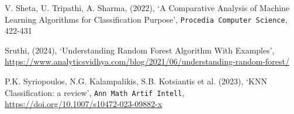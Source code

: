 \documentclass[11pt,a4paper]{article}
\begin{document}
\begin{thebibliography}{9}
V. Sheta, U. Tripathi, A. Sharma, (2022), `A Comparative Analysis of Machine Learning Algorithms for Classification Purpose', \texttt{Procedia Computer Science}, 422-431

Sruthi, (2024), `Understanding Random Forest Algorithm With Examples', \url{https://www.analyticsvidhya.com/blog/2021/06/understanding-random-forest/}

P.K. Syriopoulos, N.G. Kalampalikis, S.B. Kotsiantis et al. (2023), `KNN Classification: a review', \texttt{Ann Math Artif Intell}, \url{https://doi.org/10.1007/s10472-023-09882-x}


\end{thebibliography}
\end{document}
